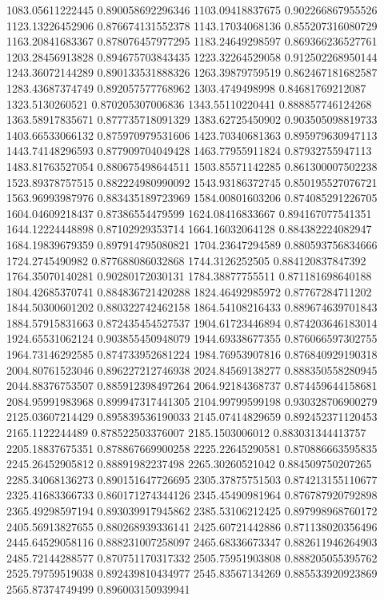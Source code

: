 {1083.05611222445 0.890058692296346
1103.09418837675 0.902266867955526
1123.13226452906 0.876674131552378
1143.17034068136 0.855207316080729
1163.20841683367 0.878076457977295
1183.24649298597 0.869366236527761
1203.28456913828 0.894675703843435
1223.32264529058 0.912502268950144
1243.36072144289 0.890133531888326
1263.39879759519 0.862467181682587
1283.43687374749 0.892057577768962
1303.4749498998 0.84681769212087
1323.5130260521 0.870205307006836
1343.55110220441 0.888857746124268
1363.58917835671 0.877735718091329
1383.62725450902 0.903505098819733
1403.66533066132 0.875970979531606
1423.70340681363 0.895979630947113
1443.74148296593 0.877909704049428
1463.77955911824 0.87932755947113
1483.81763527054 0.880675498644511
1503.85571142285 0.861300007502238
1523.89378757515 0.882224980990092
1543.93186372745 0.850195527076721
1563.96993987976 0.883435189723969
1584.00801603206 0.874085291226705
1604.04609218437 0.87386554479599
1624.08416833667 0.894167077541351
1644.12224448898 0.87102929353714
1664.16032064128 0.884382224082947
1684.19839679359 0.897914795080821
1704.23647294589 0.880593756834666
1724.2745490982 0.877688086032868
1744.3126252505 0.884120837847392
1764.35070140281 0.90280172030131
1784.38877755511 0.871181698640188
1804.42685370741 0.884836721420288
1824.46492985972 0.87767284711202
1844.50300601202 0.880322742462158
1864.54108216433 0.889674639701843
1884.57915831663 0.872435454527537
1904.61723446894 0.874203646183014
1924.65531062124 0.903855450948079
1944.69338677355 0.876066597302755
1964.73146292585 0.874733952681224
1984.76953907816 0.876840929190318
2004.80761523046 0.896227212746938
2024.84569138277 0.888350558280945
2044.88376753507 0.885912398497264
2064.92184368737 0.874459644158681
2084.95991983968 0.899947317441305
2104.99799599198 0.930328706900279
2125.03607214429 0.895839536190033
2145.07414829659 0.892452371120453
2165.1122244489 0.878522503376007
2185.1503006012 0.883031344413757
2205.18837675351 0.878867669900258
2225.22645290581 0.870886663595835
2245.26452905812 0.88891982237498
2265.30260521042 0.884509750207265
2285.34068136273 0.890151647726695
2305.37875751503 0.874213155110677
2325.41683366733 0.860171274344126
2345.45490981964 0.876787920792898
2365.49298597194 0.893039917945862
2385.53106212425 0.897998968760172
2405.56913827655 0.880268939336141
2425.60721442886 0.871138020356496
2445.64529058116 0.888231007258097
2465.68336673347 0.882611946264903
2485.72144288577 0.870751170317332
2505.75951903808 0.888205055395762
2525.79759519038 0.892439810434977
2545.83567134269 0.885533920923869
2565.87374749499 0.896003150939941
}
